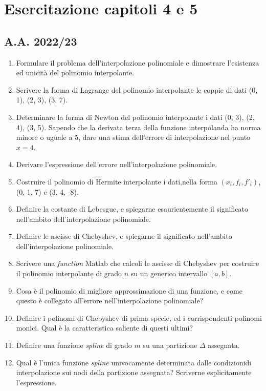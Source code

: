 \section{Esercitazione capitoli 4 e 5}
\subsection{A.A. 2022/23}
\begin{enumerate}
    \item  Formulare il problema dell'interpolazione polinomiale e dimostrare l'esistenza ed unicità del polinomio interpolante.
    \item Scrivere la forma di Lagrange del polinomio interpolante le coppie di dati (0, 1), (2, 3), (3, 7).
    \item Determinare la forma di Newton del polinomio interpolante i dati (0, 3), (2, 4), (3, 5). Sapendo che la derivata terza della funzione interpolanda ha norma minore o uguale a 5, dare una stima dell'errore di interpolazione nel punto $x = 4$.
    \item Derivare l'espressione dell'errore nell'interpolazione polinomiale.
    \item Costruire il polinomio di Hermite interpolante i dati,nella forma $(x_i, f_i , f'_i)$, (0, 1, 7) e (3, 4, -8).
    \item Definire la costante di Lebesgue, e spiegarne esaurientemente il significato nell'ambito dell'interpolazione polinomiale.
    \item Definire le ascisse di Chebyshev, e spiegarne il significato nell'ambito dell'interpolazione polinomiale.
    \item  Scrivere una \textit{function} Matlab che calcoli le ascisse di Chebyshev per costruire il polinomio interpolante di grado $n$ su un generico intervallo $[a, b]$.
    \item Cosa è il polinomio di migliore approssimazione di una funzione, e come questo è collegato all'errore nell'interpolazione polinomiale?
    \item Definire i polinomi di Chebyshev di prima specie, ed i corrispondenti polinomi monici. Qual è la caratteristica saliente di questi ultimi?
    \item Definire una funzione \textit{spline} di grado $m$ su una partizione $\Delta$ assegnata.
    \item Qual è l'unica funzione \textit{spline} univocamente determinata dalle condizionidi interpolazione sui nodi della partizione assegnata? Scriverne esplicitamente l'espressione.

\end{enumerate}
